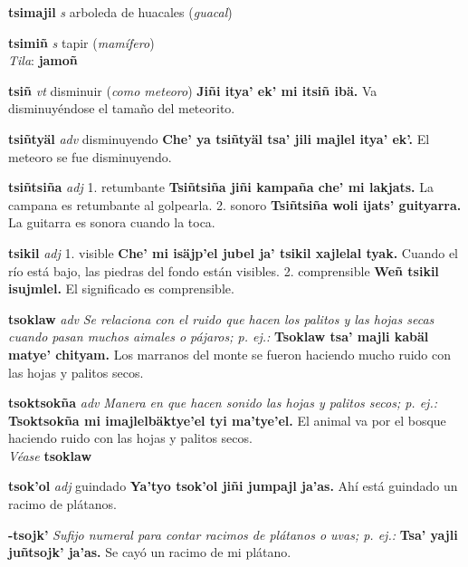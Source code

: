 \documentclass[10pt]{scrbook}
\newcommand{\entry}[1]{\textbf{#1}}
\newcommand{\onedefinition}[1]{#1.}
\newcommand{\nontranslationdef}[1]{\textit{#1}}
\newcommand{\partofspeech}[1]{\textit{#1}}
\newcommand{\spanishtranslation}[1]{#1}
\newcommand{\clarification}[1]{(\textit{#1})}
\newcommand{\cholexample}[1]{\textbf{#1}}
\newcommand{\exampletranslation}[1]{#1}
\newcommand{\dialectvariant}[1]{\\\textit{#1}:}
\newcommand{\dialectword}[1]{\textbf{#1}}
\newcommand{\alsosee}[1]{\\\textit{Véase} \textbf{#1}}
\begin{document}
\begin{multicols}{2}
\entry{tsimajil}
\partofspeech{s}
\spanishtranslation{arboleda de huacales}
\clarification{guacal}

\entry{tsimiñ}
\partofspeech{s}
\spanishtranslation{tapir}
\clarification{mamífero}
\dialectvariant{Tila}
\dialectword{jamoñ}

\entry{tsiñ}
\partofspeech{vt}
\spanishtranslation{disminuir}
\clarification{como meteoro}
\cholexample{Jiñi itya' ek' mi itsiñ ibä.}
\exampletranslation{Va disminuyéndose el tamaño del meteorito.}

\entry{tsiñtyäl}
\partofspeech{adv}
\spanishtranslation{disminuyendo}
\cholexample{Che' ya tsiñtyäl tsa' jili majlel itya' ek'.}
\exampletranslation{El meteoro se fue disminuyendo.}

\entry{tsiñtsiña}
\partofspeech{adj}
\onedefinition{1}
\spanishtranslation{retumbante}
\cholexample{Tsiñtsiña jiñi kampaña che' mi lakjats.}
\exampletranslation{La campana es retumbante al golpearla.}
\onedefinition{2}
\spanishtranslation{sonoro}
\cholexample{Tsiñtsiña woli ijats' guityarra.}
\exampletranslation{La guitarra es sonora cuando la toca.}

\entry{tsikil}
\partofspeech{adj}
\onedefinition{1}
\spanishtranslation{visible}
\cholexample{Che' mi isäjp'el jubel ja' tsikil xajlelal tyak.}
\exampletranslation{Cuando el río está bajo, las piedras del fondo están visibles.}
\onedefinition{2}
\spanishtranslation{comprensible}
\cholexample{Weñ tsikil isujmlel.}
\exampletranslation{El significado es comprensible.}

\entry{tsoklaw}
\partofspeech{adv}
\nontranslationdef{Se relaciona con el ruido que hacen los palitos y las hojas secas cuando pasan muchos aimales o pájaros; p. ej.:}
\cholexample{Tsoklaw tsa' majli kabäl matye' chityam.}
\exampletranslation{Los marranos del monte se fueron haciendo mucho ruido con las hojas y palitos secos.}

\entry{tsoktsokña}
\partofspeech{adv}
\nontranslationdef{Manera en que hacen sonido las hojas y palitos secos; p. ej.:}
\cholexample{Tsoktsokña mi imajlelbäktye'el tyi ma'tye'el.}
\exampletranslation{El animal va por el bosque haciendo ruido con las hojas y palitos secos.}
\alsosee{tsoklaw}

\entry{tsok'ol}
\partofspeech{adj}
\spanishtranslation{guindado}
\cholexample{Ya'tyo tsok'ol jiñi jumpajl ja'as.}
\exampletranslation{Ahí está guindado un racimo de plátanos.}

\entry{-tsojk'}
\nontranslationdef{Sufijo numeral para contar racimos de plátanos o uvas; p. ej.:}
\cholexample{Tsa' yajli juñtsojk' ja'as.}
\exampletranslation{Se cayó un racimo de mi plátano.}


\end{multicols}
\end{document}
